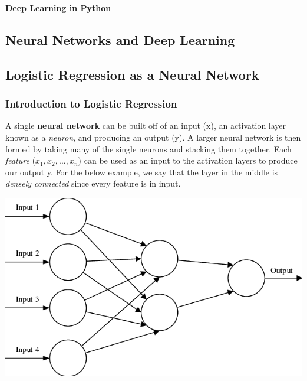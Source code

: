 \documentclass[11pt, a4paper]{article}
\begin{document}
	\begin{titlepage}
		\begin{center} \Huge \textbf{Deep Learning in Python} \end{center}
		\tableofcontents
		\newpage
	\end{titlepage}

	\begin{spacing}{1.1}
	\section{Neural Networks and Deep Learning}
	\subsection{Logistic Regression as a Neural Network}
	\subsubsection{Introduction to Logistic Regression}
	\begin{minipage}[c]{10cm}
	A single \textbf{neural network} can be built off of an input (x), an activation layer known as a \textit{neuron}, and producing an output (y). A larger neural network is then formed by taking many of the single neurons and stacking them together. Each \textit{feature} ($x_1, x_2,..., x_n$) can be used as an input to the activation layers to produce our output y. For the below example, we say that the layer in the middle is \textit{densely connected} since every feature is in input.
	\end{minipage}
	\begin{minipage}[c]{4cm}
	\hspace*{6mm} \includegraphics[scale=.25]{nn_intro} 
	\end{minipage} \vspace*{3mm} \\~\\

\end{spacing}
\end{document}
